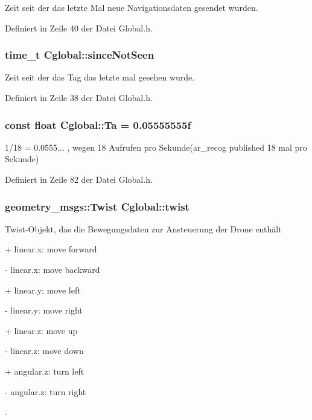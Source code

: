 Zeit seit der das letzte Mal neue Navigationsdaten gesendet wurden. 



Definiert in Zeile 40 der Datei Global.h.

\hypertarget{class_cglobal_abb1e0f2a241a8d9131098cf823b45f64}{
\subsubsection[{sinceNotSeen}]{\setlength{\rightskip}{0pt plus 5cm}time\_\-t {\bf Cglobal::sinceNotSeen}}}
\label{class_cglobal_abb1e0f2a241a8d9131098cf823b45f64}


Zeit seit der das Tag das letzte mal gesehen wurde. 



Definiert in Zeile 38 der Datei Global.h.

\hypertarget{class_cglobal_a7a599bd2c2f4400e3b7f8f98e1f293fe}{
\subsubsection[{Ta}]{\setlength{\rightskip}{0pt plus 5cm}const float {\bf Cglobal::Ta} = 0.05555555f}}
\label{class_cglobal_a7a599bd2c2f4400e3b7f8f98e1f293fe}


1/18 = 0.0555... , wegen 18 Aufrufen pro Sekunde(ar\_\-recog published 18 mal pro Sekunde) 



Definiert in Zeile 82 der Datei Global.h.

\hypertarget{class_cglobal_acdd49b2fad30faf04785664c422f5ef7}{
\subsubsection[{twist}]{\setlength{\rightskip}{0pt plus 5cm}geometry\_\-msgs::Twist {\bf Cglobal::twist}}}
\label{class_cglobal_acdd49b2fad30faf04785664c422f5ef7}


Twist-\/Objekt, das die Bewegungsdaten zur Ansteuerung der Drone enthält \par
 + linear.x: move forward \par
 -\/ linear.x: move backward \par
 + linear.y: move left \par
 -\/ linear.y: move right \par
 + linear.z: move up \par
 -\/ linear.z: move down \par
 + angular.z: turn left \par
 -\/ angular.z: turn right \par
. 



